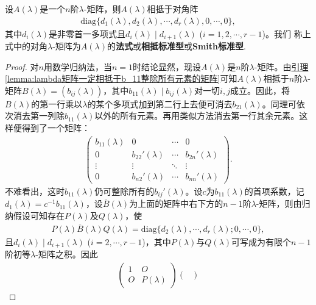 \documentclass[../../main.tex]{subfiles}%
\begin{document}
\begin{theorem}\label{theorem:lambda矩阵相抵于特殊的对角阵}
设$A(\lambda)$是一个$n$阶$\lambda$-矩阵，则$A(\lambda)$相抵于对角阵
\begin{align}
\mathrm{diag}\{d_1(\lambda),d_2(\lambda),\cdots,d_r(\lambda),0,\cdots,0\},\label{theorem0.1-7.1.1}
\end{align}
其中$d_i(\lambda)$是非零首一多项式且$d_i(\lambda)\mid d_{i + 1}(\lambda)$ ($i = 1,2,\cdots,r - 1$)。我们
称上式中的对角$\lambda$-矩阵为$A(\lambda)$的\textbf{法式}或\textbf{相抵标准型}或\textbf{Smith标准型}. 
\end{theorem}
\begin{proof}
对$n$用数学归纳法，当$n = 1$时结论显然，现设$A(\lambda)$是$n$阶$\lambda$-矩阵。由\hyperref[lemma:lambda矩阵一定相抵于b_11整除所有元素的矩阵]{引理\ref{lemma:lambda矩阵一定相抵于b_11整除所有元素的矩阵}}可知$A(\lambda)$相抵于$n$阶$\lambda$-矩阵$B(\lambda)=(b_{ij}(\lambda))$，其中$b_{11}(\lambda)\mid b_{ij}(\lambda)$对一切$i,j$成立。因此，将$B(\lambda)$的第一行乘以$\lambda$的某个多项式加到第二行上去便可消去$b_{21}(\lambda)$。同理可依次消去第一列除$b_{11}(\lambda)$以外的所有元素。再用类似方法消去第一行其余元素。这样便得到了一个矩阵：
\begin{align*}
\begin{pmatrix}
b_{11}(\lambda)&0&\cdots&0\\
0&b_{22}'(\lambda)&\cdots&b_{2n}'(\lambda)\\
\vdots&\vdots&\ddots&\vdots\\
0&b_{n2}'(\lambda)&\cdots&b_{nn}'(\lambda)
\end{pmatrix}.
\end{align*}
不难看出，这时$b_{11}(\lambda)$仍可整除所有的$b_{ij}'(\lambda)$。设$c$为$b_{11}(\lambda)$的首项系数，记$d_1(\lambda)=c^{-1}b_{11}(\lambda)$，设$\overline{B}(\lambda)$为上面的矩阵中右下方的$n - 1$阶$\lambda$-矩阵，则由归纳假设可知存在$P(\lambda)$及$Q(\lambda)$，使
\begin{align*}
P(\lambda)\overline{B}(\lambda)Q(\lambda)=\mathrm{diag}\{d_2(\lambda),\cdots,d_r(\lambda);0,\cdots,0\},
\end{align*}
且$d_i(\lambda)\mid d_{i + 1}(\lambda)$ ($i = 2,\cdots,r - 1$)，其中$P(\lambda)$与$Q(\lambda)$可写成为有限个$n - 1$阶初等$\lambda$-矩阵之积。因此
\begin{align*}
\begin{pmatrix}
1&O\\
O&P(\lambda)
\end{pmatrix}
\begin{pmatrix}

\end{pmatrix}
\end{align*}
\end{proof}
\end{document}
